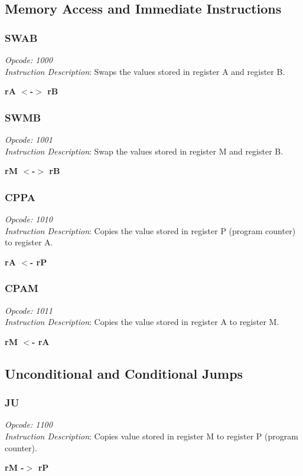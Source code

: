 \documentclass{article}
\begin{document}
\subsection{Memory Access and Immediate Instructions}

\subsubsection{SWAB}
\textit{Opcode: 1000}  \\
\textit{Instruction Description}:  Swaps the values stored in register
A and register B.
\begin{center}\textbf{rA $<$-$>$ rB}\end{center}

\subsubsection{SWMB}
\textit{Opcode: 1001}  \\
\textit{Instruction Description}: Swap the values stored in register M
and register B.
\begin{center}\textbf{rM $<$-$>$ rB}\end{center}

\subsubsection{CPPA}
\textit{Opcode: 1010}  \\
\textit{Instruction Description}:  Copies the value stored in register
P (program counter) to register A.
\begin{center}\textbf{rA $<$- rP}\end{center}

\subsubsection{CPAM}
\textit{Opcode: 1011}  \\
\textit{Instruction Description}:  Copies the value stored in register
A to register M.
\begin{center}\textbf{rM $<$- rA}\end{center}
\subsection{Unconditional and Conditional Jumps}

\subsubsection{JU}
\textit{Opcode: 1100}  \\
\textit{Instruction Description}:  Copies value stored in register M
to register P (program counter).
\begin{center}\textbf{rM -$>$ rP}\end{center}
\end{document}

